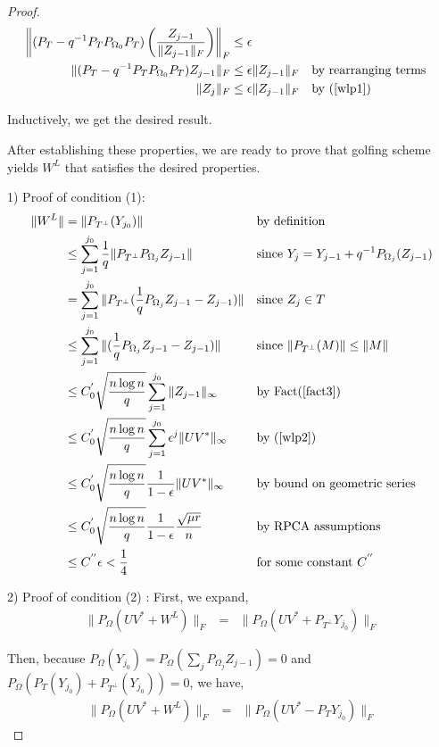 \begin{proof}
\begin{align*}
\left\|(P_{T}-q^{-1}P_{T}P_{\Omega_{0}}P_{T}) \left( \frac{Z_{j-1}}{\|Z_{j-1}\|_{F}} \right) \right\|_{F} & \le \epsilon\\
\|(P_{T}-q^{-1}P_{T}P_{\Omega_{0}}P_{T})Z_{j-1}\|_{F} & \le \epsilon\|Z_{j-1}\|_{F} && \text{by rearranging terms}\\
\|Z_{j}\|_{F} & \le \epsilon\|Z_{j-1}\|_{F} &&\text{by (\ref{wlp1}) }
\end{align*}

Inductively, we get the desired result.

After establishing these properties, we are ready to prove that golfing scheme yields $W^{L}$ that satisfies the desired properties.

1) Proof of condition (1):
\[
\begin{aligned}
\|W^{L}\| & = \|P_{T^{\bot}}(Y_{j_{0}})\| && \text{by definition}\\
 & \le \sum_{j=1}^{j_{0}}\frac{1}{q}\|P_{T^{\bot}}P_{\Omega_{j}}Z_{j-1}\|
 &&\text{since } Y_{j} = Y_{j-1} + q^{-1} P_{\Omega_{j}}(Z_{j-1})\\
 & = \sum_{j=1}^{j_{0}}\|P_{T^{\bot}}(\frac{1}{q}P_{\Omega_{j}}Z_{j-1}-Z_{j-1})\|
 &&\text{since }Z_{j}\in T\\
 & \le \sum_{j=1}^{j_{0}}\|(\frac{1}{q}P_{\Omega_{j}}Z_{j-1}-Z_{j-1})\|
 &&\text{since }\|P_{T^{\bot}}(M)\|\le\|M\|\\
 & \le C_{0}^{'}\sqrt{\frac{n\log n}{q}}\sum_{j=1}^{j_{0}}\|Z_{j-1}\|_{\infty}
 &&\text{by Fact(\ref{fact3})}\\
 & \le C_{0}^{'}\sqrt{\frac{n\log n}{q}}\sum_{j=1}^{j_{0}}\epsilon^{j}\|UV^{*}\|_{\infty}
 &&\text{by (\ref{wlp2})}\\
 & \le C_{0}^{'}\sqrt{\frac{n\log n}{q}}\frac{1}{1-\epsilon}\|UV^{*}\|_{\infty}
 &&\text{by bound on geometric series}\\
 & \le C_{0}^{'}\sqrt{\frac{n\log n}{q}}\frac{1}{1-\epsilon}\frac{\sqrt{\mu r}}{n}
 &&\text{by RPCA assumptions}\\
 & \le C^{''}\epsilon<\frac{1}{4}
 &&\text{for some constant }C^{''}
\end{aligned}
\]

2) Proof of condition (2) : First, we expand,
\begin{eqnarray*}
\|P_{\Omega}(UV^{*}+W^{L})\|_{F} & = & \|P_{\Omega}(UV^{*}+P_{T^{\bot}}Y_{j_{0}})\|_{F}
\end{eqnarray*}

Then, because $P_{\Omega}(Y_{j_{0}})=P_{\Omega}(\sum_{j}P_{\Omega_{j}}Z_{j-1})=0$ and $P_{\Omega}(P_{T}(Y_{j_{0}})+P_{T^{\bot}}(Y_{j_{0}}))=0$, we have,
\begin{eqnarray*}
\|P_{\Omega}(UV^{*}+W^{L})\|_{F} & = & \|P_{\Omega}(UV^{*}-P_{T}Y_{j_{0}})\|_{F}
\end{eqnarray*}



\end{proof}
